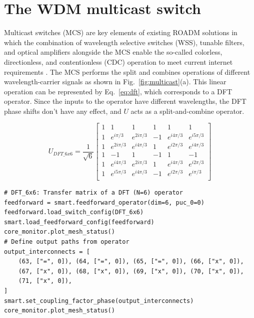 \section{The WDM multicast switch}


Multicast switches (MCS) are key elements of existing ROADM solutions in which the combination of wavelength selective switches (WSS), tunable filters, and optical amplifiers alongside the MCS enable the so-called colorless, directionless, and contentionless (CDC) operation to meet current internet requirements \cite{watanabe_multicast_2014,yang_low-cost_2017}.
The MCS performs the split and combines operations of different wavelength-carrier signals as shown in Fig.~\ref{fig:multicast}(a).
This linear operation can be represented by Eq.~\eqref{eq:dft}, which corresponds to a DFT operator.
Since the inputs to the operator have different wavelengths, the DFT phase shifts don't have any effect, and $U$ acts as a split-and-combine operator.

\begin{equation}\label{eq:dft}
	U_{DFT\_6x6} = \frac{1}{\sqrt{6}}
	\begin{bmatrix}
		1 & 1           & 1           & 1  & 1           & 1           \\
		1 & e^{i\pi/3}  & e^{2i\pi/3} & -1 & e^{i4\pi/3} & e^{i5\pi/3} \\
		1 & e^{2i\pi/3} & e^{i4\pi/3} & 1  & e^{i2\pi/3} & e^{i4\pi/3} \\
		1 & -1          & 1           & -1 & 1           & -1          \\
		1 & e^{i4\pi/3} & e^{2i\pi/3} & 1  & e^{i4\pi/3} & e^{i2\pi/3} \\
		1 & e^{i5\pi/3} & e^{i4\pi/3} & -1 & e^{i2\pi/3} & e^{i\pi/3}  \\
	\end{bmatrix}
\end{equation}

\begin{lstlisting}[caption={Implementation of a multicast switch (MCS) using a Feedforward operator},
label={lst:ch4-mcs}]
# DFT_6x6: Transfer matrix of a DFT (N=6) operator
feedforward = smart.feedforward_operator(dim=6, puc_0=0)
feedforward.load_switch_config(DFT_6x6)
smart.load_feedforward_config(feedforward)
core_monitor.plot_mesh_status()
# Define output paths from operator
output_interconnects = [
    (63, ["=", 0]), (64, ["=", 0]), (65, ["=", 0]), (66, ["x", 0]),
    (67, ["x", 0]), (68, ["x", 0]), (69, ["x", 0]), (70, ["x", 0]),
    (71, ["x", 0]),
]
smart.set_coupling_factor_phase(output_interconnects)
core_monitor.plot_mesh_status()
\end{lstlisting}

